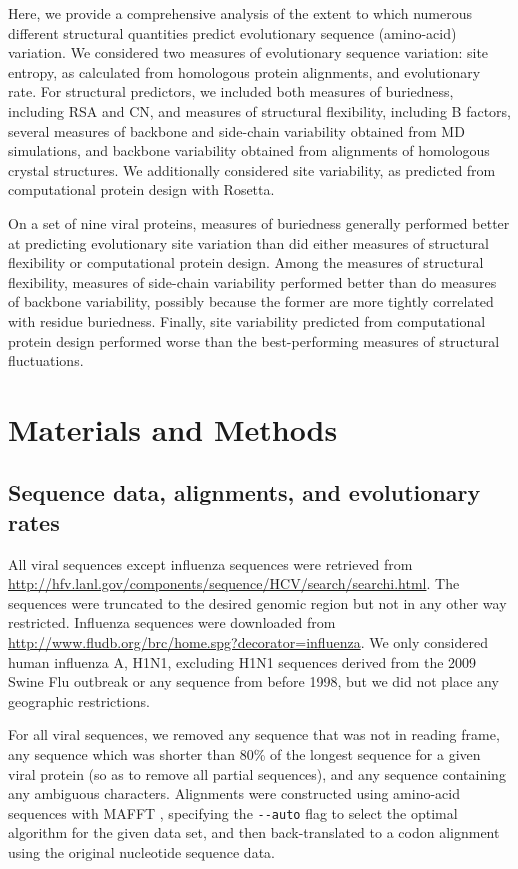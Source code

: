 \documentclass[smallextended]{svjour3}
\begin{document}
Here, we provide a comprehensive analysis of the extent to which numerous different structural quantities predict evolutionary sequence (amino-acid) variation. We considered two measures of evolutionary sequence variation: site entropy, as calculated from homologous protein alignments, and evolutionary rate. For structural predictors, we included both measures of buriedness, including RSA and CN, and measures of structural flexibility, including B factors, several measures of backbone and side-chain variability obtained from MD simulations, and backbone variability obtained from alignments of homologous crystal structures. We additionally considered site variability, as predicted from computational protein design with Rosetta. 

On a set of nine viral proteins, measures of buriedness generally performed better at predicting evolutionary site variation than did either measures of structural flexibility or computational protein design. Among the measures of structural flexibility, measures of side-chain variability performed better than do measures of backbone variability, possibly because the former are more tightly correlated with residue buriedness. Finally, site variability predicted from computational protein design performed worse than the best-performing measures of structural fluctuations.

\section*{Materials and Methods}

\subsection*{Sequence data, alignments, and evolutionary rates}

All viral sequences except influenza sequences were retrieved from \url{http://hfv.lanl.gov/components/sequence/HCV/search/searchi.html}.
The sequences were truncated to the desired genomic region but not in any other way restricted. Influenza sequences were downloaded from \url{http://www.fludb.org/brc/home.spg?decorator=influenza}. We only considered human influenza A, H1N1, excluding H1N1 sequences derived from the 2009 Swine Flu outbreak or any sequence from before 1998, but we did not place any geographic restrictions.

For all viral sequences, we removed any sequence that was not in reading frame, any sequence which was shorter than 80\% of the longest sequence for a given viral protein (so as to remove all partial sequences), and any sequence containing any ambiguous characters. Alignments were constructed using amino-acid sequences with MAFFT \citep{Katohetal2002,Katohetal2005}, specifying the \verb+--auto+ flag to select the optimal algorithm for the given data set, and then back-translated to a codon alignment using the original nucleotide sequence data.
\end{document}
